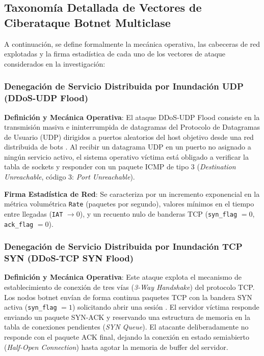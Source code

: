 \subsection{Taxonomía Detallada de Vectores de Ciberataque Botnet Multiclase}

A continuación, se define formalmente la mecánica operativa, las cabeceras de red explotadas y la firma estadística de cada uno de los vectores de ataque considerados en la investigación:

\subsubsection{Denegación de Servicio Distribuida por Inundación UDP (DDoS-UDP Flood)}
\textbf{Definición y Mecánica Operativa}: El ataque DDoS-UDP Flood consiste en la transmisión masiva e ininterrumpida de datagramas del Protocolo de Datagramas de Usuario (UDP) dirigidos a puertos aleatorios del host objetivo desde una red distribuida de bots \citep{ciciot2023}. Al recibir un datagrama UDP en un puerto no asignado a ningún servicio activo, el sistema operativo víctima está obligado a verificar la tabla de sockets y responder con un paquete ICMP de tipo 3 (\textit{Destination Unreachable}, código 3: \textit{Port Unreachable}).

\textbf{Firma Estadística de Red}: Se caracteriza por un incremento exponencial en la métrica volumétrica \texttt{Rate} (paquetes por segundo), valores mínimos en el tiempo entre llegadas (\texttt{IAT} $\to 0$), y un recuento nulo de banderas TCP (\texttt{syn\_flag} $= 0$, \texttt{ack\_flag} $= 0$).

\subsubsection{Denegación de Servicio Distribuida por Inundación TCP SYN (DDoS-TCP SYN Flood)}
\textbf{Definición y Mecánica Operativa}: Este ataque explota el mecanismo de establecimiento de conexión de tres vías (\textit{3-Way Handshake}) del protocolo TCP. Los nodos botnet envían de forma continua paquetes TCP con la bandera SYN activa (\texttt{syn\_flag} $= 1$) solicitando abrir una sesión \citep{neto2023}. El servidor víctima responde enviando un paquete SYN-ACK y reservando una estructura de memoria en la tabla de conexiones pendientes (\textit{SYN Queue}). El atacante deliberadamente no responde con el paquete ACK final, dejando la conexión en estado semiabierto (\textit{Half-Open Connection}) hasta agotar la memoria de buffer del servidor.

